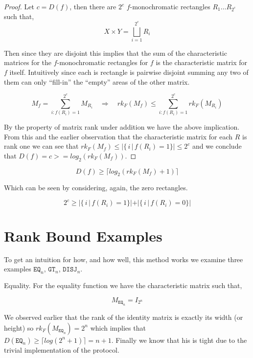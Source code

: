\documentclass[usletter]{article}
\begin{document}
\begin{proof}
Let $c = D(f)$, then there are $2^c$ $f$-monochromatic rectangles $R_1 \ldots R_{2^c}$ such that,
\begin{equation*}
  X \times Y = \bigsqcup_{i=1}^{2^c} R_i
\end{equation*}

Then since they are disjoint this implies that the sum of the characteristic matrices for the $f$-monochromatic rectangles for $f$ is the characteristic matrix for $f$ itself. Intuitively since each is rectangle is pairwise disjoint summing any two of them can only ``fill-in'' the ``empty'' areas of the other matrix.

\begin{equation*}
  M_f = \sum_{i:f(R_i) = 1}^{2^c} M_{R_i} \quad
    \Rightarrow \quad rk_{F}(M_f) \leq \sum_{i:f(R_i) = 1}^{2^c} rk_{F}(M_{R_i})
\end{equation*}

By the property of matrix rank under addition we have the above implication. From this and the earlier observation that the characteristic matrix for each $R$ is rank one we can see that $rk_{F}(M_f) \leq |\{\, i\, |\, f(R_i) = 1 \}| \leq 2^c$ and we conclude that $D(f) = c >= log_2(rk_{F}(M_f))$.
\end{proof}

\begin{corollary}
  \begin{equation*}
    D(f) \geq \lceil log_2(rk_{F}(M_f) + 1) \rceil
  \end{equation*}
\end{corollary}


Which can be seen by considering, again, the zero rectangles.

\begin{equation*}
  2^c \geq |\{\, i\, |\, f(R_i) = 1 \}| + |\{\, i\, |\, f(R_i) = 0 \}|
\end{equation*}

\section{Rank Bound Examples} \label{sec:rank-bound-eg}

To get an intuition for how, and how well, this method works we examine three examples $\mathtt{EQ}_n$, $\mathtt{GT}_n$, $\mathtt{DISJ}_n$.

\begin{example} Equality.
  For the equality function we have the characteristic matrix such that,

  \begin{equation*}
    M_{\mathtt{EQ}_n} = I_{2^n}
  \end{equation*}

  We observed earlier that the rank of the identity matrix is exactly its width (or height) so $rk_{F}(M_{\mathtt{EQ}_n}) = 2^n$ which implies that $D(\mathtt{EQ}_n) \geq \lceil log(2^n + 1) \rceil = n + 1$. Finally we know that his is tight due to the trivial implementation of the protocol.
\end{example}
\end{document}
